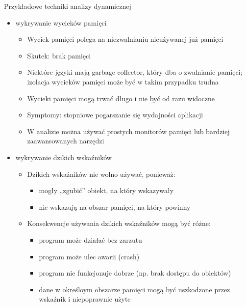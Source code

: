 \documentclass[../main.tex]{subfiles}
\begin{document}
    Przykładowe techniki analizy dynamicznej
    \begin{itemize}
        \item wykrywanie wycieków pamięci
        \begin{itemize}
            \item Wyciek pamięci polega na niezwalnianiu nieużywanej już pamięci
            \item Skutek: brak pamięci
            \item Niektóre języki mają garbage collector, który dba o zwalnianie pamięci;
            izolacja wycieków pamięci może być w takim przypadku trudna
            \item Wycieki pamięci mogą trwać długo i nie być od razu widoczne
            \item Symptomy: stopniowe pogarszanie się wydajności aplikacji
            \item W analizie można używać prostych monitorów pamięci lub bardziej zaawansowanych narzędzi
        \end{itemize}

        \item wykrywanie dzikich wskaźników
        \begin{itemize}
            \item Dzikich wskaźników nie wolno używać, ponieważ:
            \begin{itemize}
                \item mogły „zgubić” obiekt, na który wskazywały
                \item nie wskazują na obszar pamięci, na który powinny
            \end{itemize}
            \item Konsekwencje używania dzikich wskaźników mogą być różne:
            \begin{itemize}
                \item program może działać bez zarzutu
                \item program może ulec awarii (crash)
                \item program nie funkcjonuje dobrze (np. brak dostępu do obiektów)
                \item dane w określoym obszarze pamięci mogą być uszkodzone przez wskaźnik i niepoprawnie użyte
            \end{itemize}
        \end{itemize}


\end{itemize}
\end{document}
